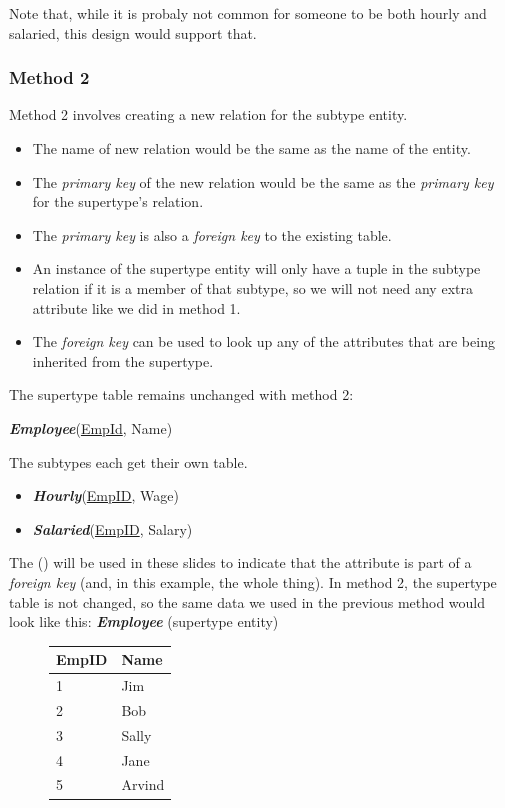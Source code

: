 \documentclass{report}
\begin{document}
\noindent Note that, while it is probaly not common for someone to be both hourly and salaried, this design would support that.
\subsubsection*{Method 2}
Method 2 involves creating a new relation for the subtype entity.
\begin{itemize}
    \item The name of new relation would be the same as the name of the entity.
    \item The \textit{primary key} of the new relation would be the same as the \textit{primary key} for the supertype's relation.
    \item The \textit{primary key} is also a \textit{foreign key} to the existing table.
    \item An instance of the supertype entity will only have a tuple in the subtype relation if it is a member of that subtype, so we will not need any extra attribute like we did in method 1.
    \item The \textit{foreign key} can be used to look up any of the attributes that are being inherited from the supertype.
\end{itemize}
\bigbreak \noindent
The supertype table remains unchanged with method 2:
\begin{itemize}
    \textit{\textbf{Employee}}(\underline{EmpId}, Name)
\end{itemize}
The subtypes each get their own table.
\begin{itemize}
    \item \textit{\textbf{Hourly}}(\underline{EmpID\dag}, Wage)
    \item \textit{\textbf{Salaried}}(\underline{EmpID\dag}, Salary)
\end{itemize}
The (\dag) will be used in these slides to indicate that the attribute is part of a \textit{foreign key} (and, in this example, the whole thing).
\bigbreak \noindent
In method 2, the supertype table is not changed, so the same data we used in the previous method would look like this:
\bigbreak \noindent
\textit{\textbf{Employee}} (supertype entity)
    \begin{figure}[H]
    \centering
     \setlength{\tabcolsep}{30}
    \begin{tabular}{ll}
    \toprule 
    EmpID&Name \\
    \midrule
    1& Jim \\
    2& Bob\\
    3& Sally \\
    4& Jane \\
    5& Arvind \\
    \bottomrule
    \end{tabular}
    \end{figure}
    \newpage
    
\end{document}
